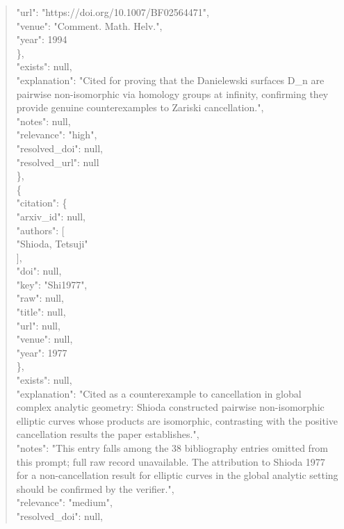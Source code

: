 \documentclass[11pt]{article}
\begin{document}
\begin{quote}
        "url": "https://doi.org/10.1007/BF02564471",\\
        "venue": "Comment. Math. Helv.",\\
        "year": 1994\\
      \},\\
      "exists": null,\\
      "explanation": "Cited for proving that the Danielewski surfaces D\_n are pairwise non-isomorphic via homology groups at infinity, confirming they provide genuine counterexamples to Zariski cancellation.",\\
      "notes": null,\\
      "relevance": "high",\\
      "resolved\_doi": null,\\
      "resolved\_url": null\\
    \},\\
    \{\\
      "citation": \{\\
        "arxiv\_id": null,\\
        "authors": [\\
          "Shioda, Tetsuji"\\
        ],\\
        "doi": null,\\
        "key": "Shi1977",\\
        "raw": null,\\
        "title": null,\\
        "url": null,\\
        "venue": null,\\
        "year": 1977\\
      \},\\
      "exists": null,\\
      "explanation": "Cited as a counterexample to cancellation in global complex analytic geometry: Shioda constructed pairwise non-isomorphic elliptic curves whose products are isomorphic, contrasting with the positive cancellation results the paper establishes.",\\
      "notes": "This entry falls among the 38 bibliography entries omitted from this prompt; full raw record unavailable. The attribution to Shioda 1977 for a non-cancellation result for elliptic curves in the global analytic setting should be confirmed by the verifier.",\\
      "relevance": "medium",\\
      "resolved\_doi": null,\\

\end{quote}
\end{document}
